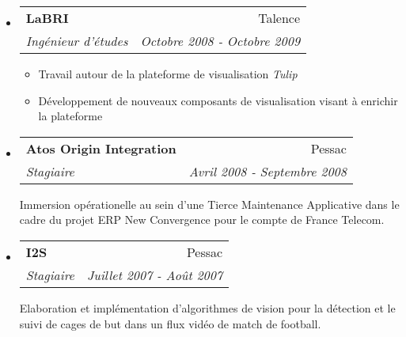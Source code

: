 \documentclass[letterpaper,11pt]{article}
\makeatletter
\newcommand{\resitem}[1]{\item #1 \vspace{-2pt}}
\newcommand{\ressubheading}[4]{
\begin{tabular*}{6.5in}{l@{\cftdotfill{\cftsecdotsep}\extracolsep{\fill}}r}
    \textbf{#1} & #2 \\
    \textit{#3} & \textit{#4} \\
\end{tabular*}\vspace{-6pt}}
\makeatother
\begin{document}
\begin{itemize}
  \item
    \ressubheading{LaBRI}{Talence}{Ingénieur d'études}{Octobre 2008 - Octobre 2009}
    \begin{itemize}
      \resitem{Travail autour de la plateforme de visualisation \emph{Tulip}}
      \resitem{Développement de nouveaux composants de visualisation visant à enrichir la plateforme}
    \end{itemize}

  \item
    \ressubheading{Atos Origin Integration}{Pessac}{Stagiaire}{Avril 2008 - Septembre 2008}

    Immersion opérationelle au sein d'une Tierce Maintenance Applicative dans le cadre du projet ERP New Convergence pour le compte de France Telecom.

  \item
    \ressubheading{I2S}{Pessac}{Stagiaire}{Juillet 2007 - Août 2007}

    Elaboration et implémentation d'algorithmes de vision pour la détection et le suivi de cages de but dans un flux vidéo de match de football.

\end{itemize}
\end{document}

